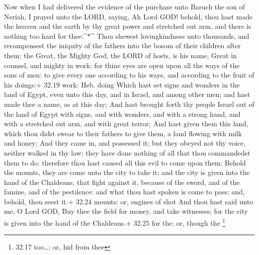  Now when I had delivered the evidence of the purchase unto
Baruch the son of Neriah, I prayed unto the LORD, saying, 
Ah Lord GOD! behold, thou hast made the heaven and the earth by thy
great power and stretched out arm, and there is nothing too hard for
thee:\^{}*\^{}  Thou shewest lovingkindness unto thousands,
and recompensest the iniquity of the fathers into the bosom of their
children after them: the Great, the Mighty God, the LORD of hosts, is
his name,  Great in counsel, and mighty in work: for thine
eyes are open upon all the ways of the sons of men: to give every one
according to his ways, and according to the fruit of his doings:+ 32.19
work: Heb. doing  Which hast set signs and wonders in the
land of Egypt, even unto this day, and in Israel, and among other men;
and hast made thee a name, as at this day;  And hast
brought forth thy people Israel out of the land of Egypt with signs, and
with wonders, and with a strong hand, and with a stretched out arm, and
with great terror;  And hast given them this land, which
thou didst swear to their fathers to give them, a land flowing with milk
and honey;  And they came in, and possessed it; but they
obeyed not thy voice, neither walked in thy law; they have done nothing
of all that thou commandedst them to do: therefore thou hast caused all
this evil to come upon them:  Behold the mounts, they are
come unto the city to take it; and the city is given into the hand of
the Chaldeans, that fight against it, because of the sword, and of the
famine, and of the pestilence: and what thou hast spoken is come to
pass; and, behold, thou seest it.+ 32.24 mounts: or, engines of shot
 And thou hast said unto me, O Lord GOD, Buy thee the field
for money, and take witnesses; for the city is given into the hand of
the Chaldeans.+ 32.25 for the: or, though the \footnote{32.17 too\ldots:
  or, hid from thee}

